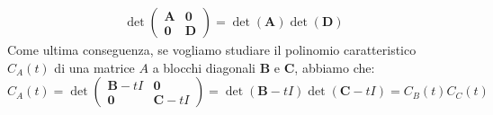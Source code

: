 \begin{demonstration}
\begin{gather}
\det\left(
\begin{array}{c|c}
	\mathbf{A} & \mathbf{0}\\
	\hline
	\mathbf{0} & \mathbf{D}
\end{array}
\right)=\det\left(\mathbf{A}\right)\det\left(\mathbf{D}\right)
\end{gather}
Come ultima conseguenza, se vogliamo studiare il polinomio caratteristico $C_A\left(t\right)$ di una matrice $A$ a blocchi diagonali $\mathbf{B}$ e $\mathbf{C}$, abbiamo che:
\begin{equation}
C_A\left(t\right)=\det\left(
\begin{array}{c|c}
	\mathbf{B}-t I & \mathbf{0}\\
	\hline
	\mathbf{0} & \mathbf{C}-t I
\end{array}
\right)=\det\left(\mathbf{B}-t I\right)\det\left(\mathbf{C}-t I\right)=C_B\left(t\right)C_C\left(t\right)
\end{equation}
\end{demonstration}
